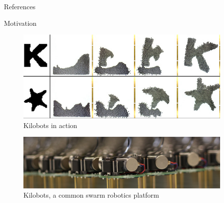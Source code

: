 \begin{frame}[allowframebreaks]{References}
  
  
\end{frame}

\begin{frame}{Motivation}
\vspace{0.5em}

\begin{figure}
\begin{columns}%
        \begin{column}{0.75\textwidth}%
            \includegraphics[width=\textwidth,right]{images/Kilobots31}
        \end{column}%
        \begin{column}{0.25\textwidth}%
            \caption{Kilobots in action \scriptsize{\cite{mike_rubenstein_kilobots31_2014}}}
        \end{column}%
    \end{columns}
\end{figure}

\vspace{1.5em}
\begin{figure}
\begin{columns}%
        \begin{column}{0.75\textwidth}%
            \includegraphics[width=\textwidth,right]{images/kilobots}
        \end{column}%
        \begin{column}{0.25\textwidth}%
            \caption{Kilobots, a common swarm robotics platform \scriptsize{\cite{ssr_lab_harvard_university_swarm2.jpg_????}}}
        \end{column}%
    \end{columns}
\end{figure}

\end{frame}

